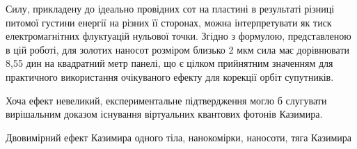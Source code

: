 \documentclass[twoside, 10pt]{article}
\begin{document}
Силу, прикладену до ідеально провідних сот на пластині в результаті
різниці питомої густини енергії на різних її сторонах, можна інтерпретувати
як тиск електромагнітних флуктуацій нульової точки.
Згідно з формулою, представленою в цій роботі, для золотих наносот
розміром близько 2 мкм сила має дорівнювати 8,55 дин на квадратний метр панелі, що є цілком
прийнятним значенням для практичного використання очікуваного ефекту для корекції орбіт супутників.

    Хоча ефект невеликий, експериментальне підтвердження
могло б слугувати вирішальним доказом існування віртуальних квантових фотонів Казимира.

\vspace{5mm}

\noindent
\begin{keywordsukr}
Двовимірний ефект Казимира одного тіла, нанокомірки, наносоти, тяга Казимира
\end{keywordsukr}

    
\end{document}
